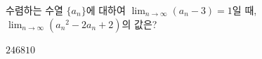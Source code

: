 수렴하는 수열 $\{a_n\}$에 대하여 $\displaystyle\lim_{n\to\infty}(a_n-3)=1$일 때, $\displaystyle\lim_{n\to\infty}({a_n}^2-2a_n+2)$의 값은?
\begin{choices32}{$2$}{$4$}{$6$}{$8$}{$10$}\end{choices32}

